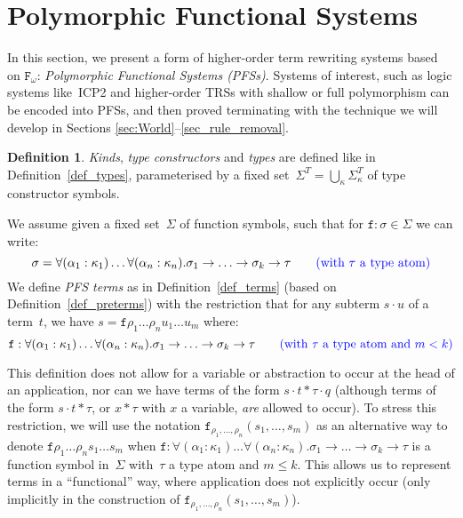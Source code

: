 \documentclass[a4paper,UKenglish,cleveref,autoref,numberwithinsect]{lipics-v2019}
\theoremstyle{definition}
\newtheorem{defn}[theorem]{Definition}
\newcommand{\Fomega}{\mathtt{F}_\omega}
\newcommand{\arrtype}{\rightarrow}
\newcommand{\app}[2]{#1 \cdot #2}
\newcommand{\CKchange}[1]{\textcolor{blue}{#1}}
\begin{document}
\section{Polymorphic Functional Systems}\label{sec_systems}

In this section, we present a form of higher-order term rewriting
systems based on $\Fomega$: \emph{Polymorphic Functional Systems
  (PFSs)}. Systems of interest, such as logic systems like~ICP2 and
higher-order TRSs with shallow or full polymorphism can be encoded
into PFSs, and then proved terminating with the technique we will
develop in Sections \ref{sec:World}--\ref{sec_rule_removal}.

\begin{defn}\label{def_pafs_types_terms}
  \emph{Kinds}, \emph{type constructors} and \emph{types} are defined
  like in Definition~\ref{def_types}, parameterised by a fixed
  set~$\Sigma^T = \bigcup_{\kappa}\Sigma^T_\kappa$ of type constructor
  symbols.

  We assume given a fixed set~$\Sigma$ of function symbols, such
  that for $\mathtt{f} : \sigma \in \Sigma$ we can write:
    \[
    \sigma = \forall (\alpha_1 : \kappa_1) \ldots \forall (\alpha_n : \kappa_n)
    . \sigma_1 \arrtype \ldots \arrtype \sigma_k \arrtype \tau
    \CKchange{\quad\quad (\text{with}\ \tau\ \text{a type atom})}
    \]
  We define \emph{PFS
    terms} as in Definition~\ref{def_terms} (based on
  Definition~\ref{def_preterms}) with the restriction that
  for any subterm $\app{s}{u}$ of a term~$t$, we have $s =
    \mathtt{f} \rho_1 \ldots \rho_n u_1 \ldots u_m$ where:
    \[
    \mathtt{f} : \forall (\alpha_1 : \kappa_1) \ldots
    \forall (\alpha_n : \kappa_n) . \sigma_1 \arrtype \ldots \arrtype
    \sigma_k \arrtype \tau
    \CKchange{\quad\quad (\text{with}\ \tau\ \text{a type atom and}\ m < k)}
    \]
\end{defn}

This definition does not allow for a variable or
abstraction to occur at the head of an application, nor can we have
terms of the form $s \cdot t * \tau \cdot q$ (although terms of the
form $s \cdot t * \tau$, or $x * \tau$ with $x$ a variable,
\emph{are} allowed to occur).  To stress this restriction, we will
use the notation
$\mathtt{f}_{\rho_1,\ldots,\rho_n}(s_1,\ldots,s_m)$ as an alternative
way to denote
$\mathtt{f} \rho_1 \ldots \rho_n s_1 \ldots s_m$ when
$
  \mathtt{f} : \forall (\alpha_1 : \kappa_1) \ldots
  \forall (\alpha_n : \kappa_n) . \sigma_1 \arrtype \ldots \arrtype
  \sigma_k \arrtype \tau
$
is a function symbol in~$\Sigma$ with~$\tau$ a type atom and $m \leq k$.
This allows us to represent terms in a ``functional'' way, where
application does not explicitly occur (only implicitly in the
\pagebreak
construction of $\mathtt{f}_{\rho_1,\ldots,\rho_n}(s_1,\ldots,s_m)$).
\end{document}
